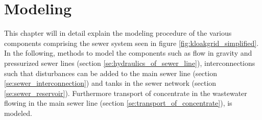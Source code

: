 \chapter{Modeling}\label{se:modeling}

This chapter will in detail explain the modeling procedure of the various components comprising the sewer system seen in figure \ref{fig:kloakgrid_simplified}.
In the following, methods to model the components such as flow in gravity and pressurized sewer lines (section \ref{se:hydraulics_of_sewer_line}), interconnections such that disturbances can be added to the main sewer line (section \ref{se:sewer_interconnection}) and tanks in the sewer network (section \ref{se:sewer_reservoir}). Furthermore transport of concentrate in the wastewater flowing in the main sewer line (section \ref{se:transport_of_concentrate}), is modeled.







